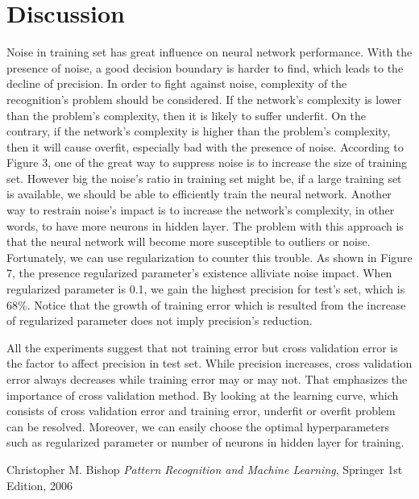 \documentclass[a4paper, 11pt]{article}
\begin{document}
\section{Discussion}
Noise in training set has great influence on neural network performance. With the presence of noise, a good decision boundary is harder to find, which leads to the decline of precision. In order to fight against noise, complexity of the recognition's problem should be considered. If the network's complexity is lower than the problem's complexity, then it is likely to suffer underfit. On the contrary, if the network's complexity is higher than the problem's complexity, then it will cause overfit, especially bad with the presence of noise. According to Figure 3, one of the great way to suppress noise is to increase the size of training set. However big the noise's ratio in training set might be, if a large training set is available, we should be able to efficiently train the neural network. Another way to restrain noise's impact is to increase the network's complexity, in other words, to have more neurons in hidden layer. The problem with this approach is that the neural network will become more susceptible to outliers or noise. Fortunately, we can use regularization to counter this trouble. As shown in Figure 7, the presence regularized parameter's existence alliviate noise impact. When regularized parameter is 0.1, we gain the highest precision for test's set, which is 68\%. Notice that the growth of training 
error which is resulted from the increase of regularized parameter does not imply precision's reduction.

All the experiments suggest that not training error but cross validation error is the factor to affect precision in test set. While precision increases, cross validation error always decreases while training error may or may not. That emphasizes the importance of cross validation method. By looking at the learning curve, which consists of cross validation error and training error, underfit or overfit problem can be resolved. Moreover, we can easily choose the optimal hyperparameters such as regularized parameter or number of neurons in hidden layer for training.


\begin{thebibliography}{9}
  \label{itm:PRML}
  Christopher M. Bishop
  \emph{Pattern Recognition and Machine Learning},
  Springer
  1st Edition,
  2006
\end{thebibliography}
\end{document}
